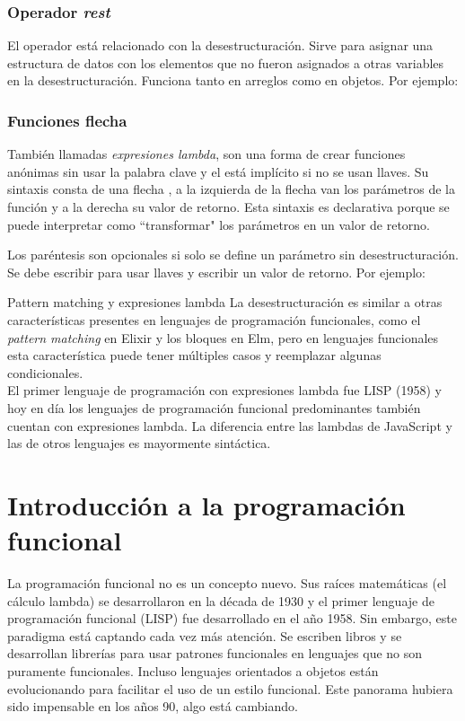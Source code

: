 \documentclass{article}
\newcommand{\code}[1]{\tcbox{\texttt{#1}}}
\newcommand{\codejs}[1]{\tcbox{\lstinline[style=ES6]{#1}}}
\newcommand{\jsfile}[2]{}
\newenvironment{info}[1]
  {\begin{bclogo}[logo=\bcinfo, couleurBarre=orange, noborder=true, couleur=white]{#1}}
  {\end{bclogo}}
\begin{document}
\subsubsection{Operador \textit{rest} \codejs{...}}
El operador \codejs{...} está relacionado con la desestructuración. Sirve para asignar una estructura de datos con los elementos que no fueron asignados a otras variables en la desestructuración. Funciona tanto en arreglos como en objetos. Por ejemplo:
\jsfile{Ejemplo del operador rest}{code/destructing/rest.js}

\subsubsection{Funciones flecha \codejs{=>}}
También llamadas \textit{expresiones lambda}, son una forma de crear funciones anónimas sin usar la palabra clave \codejs{function} y el \codejs{return} está implícito si no se usan llaves. Su sintaxis consta de una flecha \codejs{=>}, a la izquierda de la flecha van los parámetros de la función y a la derecha su valor de retorno. Esta sintaxis es declarativa porque se puede interpretar como ``transformar" \medspace los parámetros en un valor de retorno.

Los paréntesis son opcionales si solo se define un parámetro sin desestructuración. Se debe escribir \codejs{return} para usar llaves y escribir un valor de retorno. Por ejemplo:
\jsfile{Ejemplo de funciones flecha}{code/functions/arrow.js}

\begin{info}{Pattern matching y expresiones lambda}
  La desestructuración es similar a otras características presentes en lenguajes de programación funcionales, como el \textit{pattern matching} en Elixir\cite{elixir-pattern-match} y los bloques \code{case} en Elm\cite{elm-case}, pero en lenguajes funcionales esta característica puede tener múltiples casos y reemplazar algunas condicionales. \medskip \\
  El primer lenguaje de programación con expresiones lambda fue LISP (1958) y hoy en día los lenguajes de programación funcional predominantes también cuentan con expresiones lambda. La diferencia entre las lambdas de JavaScript y las de otros lenguajes es mayormente sintáctica.
\end{info}


\section{Introducción a la programación funcional}
\label{sec:fp-intro}
La programación funcional no es un concepto nuevo. Sus raíces matemáticas (el cálculo lambda) se desarrollaron en la década de 1930 y el primer lenguaje de programación funcional (LISP) fue desarrollado en el año 1958. Sin embargo, este paradigma está captando cada vez más atención. Se escriben libros y se desarrollan librerías para usar patrones funcionales en lenguajes que no son puramente funcionales. Incluso lenguajes orientados a objetos están evolucionando para facilitar el uso de un estilo funcional. Este panorama hubiera sido impensable en los años 90, algo está cambiando.\cite{why-isnt-fp-norm}
\end{document}
